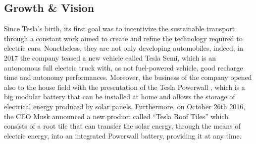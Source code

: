 \subsection{Growth & Vision}
Since Tesla's birth, its first goal was to incentivize the sustainable transport through a constant work aimed to create and refine the technology required to electric cars. Nonetheless, they are not only developing automobiles, indeed, in 2017 the company teased a new vehicle called Tesla Semi, which is an autonomous full electric truck with, as not fuel-powered  vehicle, good recharge time and autonomy performances. %
Moreover, the business of the company opened also to the house field with the presentation of the Tesla Powerwall \cite{Powerwall}, which is a big modular battery that can be installed at home and allows the storage of electrical energy produced by solar panels. Furthermore, on October 26th 2016, the CEO Musk announced a new product called “Tesla Roof Tiles” which consists of a root tile that can transfer the solar energy, through the means of electric energy, into an integrated Powerwall battery, providing it at any time.


